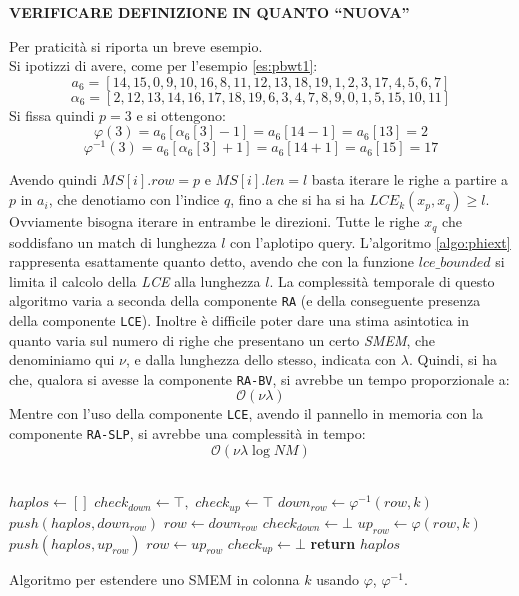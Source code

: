 \textbf{VERIFICARE DEFINIZIONE IN QUANTO ``NUOVA''}
\begin{esempio}
  Per praticità si riporta un breve esempio.\\
  Si ipotizzi di avere, come per l'esempio \ref{es:pbwt1}:
  \[a_6=[14,15,0,9,10,16,8,11,12,13,18,19,1,2,3,17,4,5,6,7]\]
  \[\alpha_6=[2,12,13,14,16,17,18,19,6,3,4,7,8,9,0,1,5,15,10,11]\]
  Si fissa quindi $p=3$ e si ottengono:
  \[\varphi(3)=a_6[\alpha_6[3]-1]=a_6[14-1]=a_6[13]=2\]
  \[\varphi^{-1}(3)=a_6[\alpha_6[3]+1]=a_6[14+1]=a_6[15]=17\]
\end{esempio}
Avendo quindi $MS[i].row=p$ e $MS[i].len=l$ basta iterare le righe a partire a
$p$ in $a_i$, che denotiamo con l'indice $q$, fino a che si ha si ha 
$LCE_k(x_p, x_q)\geq l$. Ovviamente bisogna iterare in entrambe le
direzioni. Tutte le righe $x_q$ che soddisfano un match di lunghezza $l$ con
l'aplotipo query. L'algoritmo \ref{algo:phiext} rappresenta esattamente quanto
detto, avendo che con la funzione $lce\_bounded$ si limita il calcolo della
\textit{LCE} alla lunghezza $l$. La complessità temporale di questo algoritmo
varia a seconda della componente \texttt{RA} (e della conseguente presenza della
componente \texttt{LCE}). Inoltre è difficile poter dare una stima asintotica in
quanto varia sul numero di righe che presentano un certo \textit{SMEM}, che
denominiamo qui $\nu$, e dalla lunghezza dello stesso, indicata con
$\lambda$. Quindi, si ha che, qualora si avesse la componente \texttt{RA-BV}, si
avrebbe un tempo proporzionale a:
\begin{equation}
  \label{eq:phiaccbv}
  \mathcal{O}(\nu\lambda)
\end{equation}
Mentre con l'uso della componente \texttt{LCE}, avendo il pannello in memoria
con la componente \texttt{RA-SLP}, si avrebbe una complessità in tempo:
\begin{equation}
  \label{eq:phiaccbv2}
  \mathcal{O}(\nu\lambda\log NM)
\end{equation}
\\
\begin{algorithm}
  \begin{algorithmic}[1]
    \State $haplos\gets []$
    \State $check_{down}\gets \top,\,\,check_{up}\gets \top$
    \State $down_{row}\gets \varphi^{-1}(row, k)$
    \State $push(haplos, down_{row})$
    \State $row \gets down_{row}$
    \Else
    \State $check_{down}\gets \bot$
    \EndIf
    \EndWhile
    \State $up_{row}\gets \varphi(row, k)$
    \State $push(haplos, up_{row})$
    \State $row \gets up_{row}$
    \Else
    \State $check_{up}\gets \bot$
    \EndIf
    \EndWhile
    \State \textbf{return} $haplos$
    \EndFunction
  \end{algorithmic}
  \caption{Algoritmo per estendere uno SMEM in colonna $k$ usando $\varphi$,
  $\varphi^{-1}$.}
  \label{algo:phiext}
\end{algorithm}
